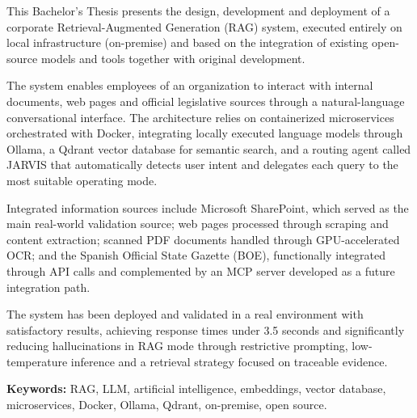 This Bachelor's Thesis presents the design, development and deployment of a corporate Retrieval-Augmented Generation (RAG) system, executed entirely on local infrastructure (on-premise) and based on the integration of existing open-source models and tools together with original development.

The system enables employees of an organization to interact with internal documents, web pages and official legislative sources through a natural-language conversational interface. The architecture relies on containerized microservices orchestrated with Docker, integrating locally executed language models through Ollama, a Qdrant vector database for semantic search, and a routing agent called JARVIS that automatically detects user intent and delegates each query to the most suitable operating mode.

Integrated information sources include Microsoft SharePoint, which served as the main real-world validation source; web pages processed through scraping and content extraction; scanned PDF documents handled through GPU-accelerated OCR; and the Spanish Official State Gazette (BOE), functionally integrated through API calls and complemented by an MCP server developed as a future integration path.

The system has been deployed and validated in a real environment with satisfactory results, achieving response times under 3.5 seconds and significantly reducing hallucinations in RAG mode through restrictive prompting, low-temperature inference and a retrieval strategy focused on traceable evidence.

\vspace{0.5cm}
\noindent\textbf{Keywords:} RAG, LLM, artificial intelligence, embeddings, vector database, microservices, Docker, Ollama, Qdrant, on-premise, open source.

\newpage

